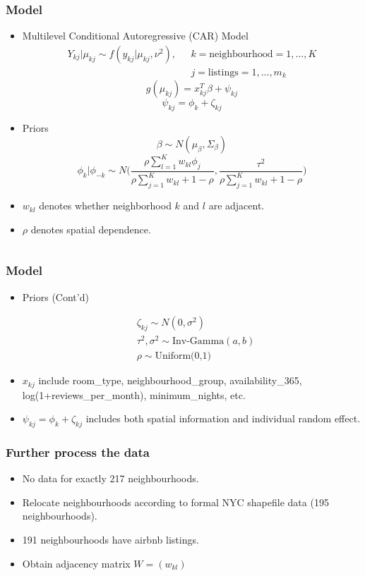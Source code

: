 \documentclass{beamer}
\begin{document}
\begin{frame}
\frametitle{Model}
\begin{itemize}
	\item Multilevel Conditional Autoregressive (CAR) Model
$$ \begin{aligned}
 	Y_{kj}|\mu_{kj} \sim f(y_{kj}|\mu_{kj}, \nu^2), \ \ \ &k= \text{neighbourhood}
=1,...,K\\
  &j=\text{listings}=1,...,m_k \end{aligned}$$
$$g(\mu_{kj})=x_{kj}^T\beta + \psi_{kj}$$
$$\psi_{kj}=\phi_k + \zeta_{kj}$$
\item Priors
$$\beta \sim N(\mu_\beta, \Sigma_\beta)$$
$$\phi_k|\phi_{-k} \sim N\Big(\frac{\rho \sum_{l=1}^K w_{kl}\phi_j}{\rho \sum_{j=1}^K w_{kl}+1-\rho}, \frac{\tau^2}{\rho\sum_{j=1}^Kw_{kl}+1-\rho}\Big)$$
\item $w_{kl}$ denotes whether neighborhood $k$ and $l$ are adjacent.
\item $\rho$ denotes spatial dependence.
\end{itemize}
$$  $$
\end{frame}








\begin{frame}
\frametitle{Model}
\begin{itemize}\item Priors (Cont'd)

	$$\begin{aligned}
	&\zeta_{kj}\sim N(0, \sigma^2)\\
	&\tau^2, \sigma^2\sim \text{Inv-Gamma} (a,b)\\
	&\rho \sim \text{Uniform(0,1)}
\end{aligned}$$

	\item $x_{kj}$ include room\_type, neighbourhood\_group, availability\_365, log(1+reviews\_per\_month), minimum\_nights, etc.
	\item  $\psi_{kj}=\phi_k + \zeta_{kj}$ includes both spatial information and individual random effect. 
\end{itemize}

\end{frame}




\begin{frame}
\frametitle{Further process the data}
\begin{itemize}
	\item No data for exactly 217 neighbourhoods.
	\item Relocate neighbourhoods according to formal NYC shapefile data (195 neighbourhoods).
	\item 191 neighbourhoods have airbnb listings.
	\item Obtain adjacency matrix $W=(w_{kl})$

\end{itemize}
	
\end{frame}
\end{document}
